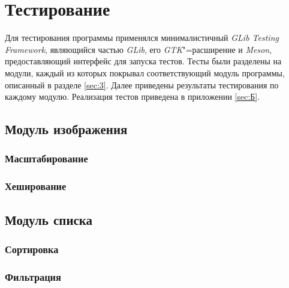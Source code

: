 \chapter{Тестирование}

Для тестирования программы применялся минималистичный \textit{GLib Testing
Framework}, являющийся частью \textit{GLib}, его \textit{GTK}"=расширение и
\textit{Meson}, предоставляющий интерфейс для запуска тестов. Тесты были
разделены на модули, каждый из которых покрывал соответствующий модуль
программы, описанный в разделе \ref{sec:3}. Далее приведены результаты
тестирования по каждому модулю. Реализация тестов приведена в приложении
\ref{sec:Б}. 

\section{Модуль изображения}

\subsection{Масштабирование}

\subsection{Хеширование}

\section{Модуль списка}

\subsection{Сортировка}

\subsection{Фильтрация}
